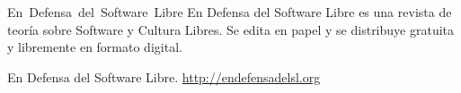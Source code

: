     \newpage
    \thispagestyle{empty}

    \begin{flushleft}\hbox{\Large{En Defensa del Software Libre}}
    En Defensa del Software Libre es una revista de teoría sobre Software y Cultura
    Libres. Se edita en papel y se distribuye gratuita y libremente en formato
    digital. 

    \vfill
    \copyleft  \the\year  En Defensa del Software Libre.
    \url{http://endefensadelsl.org}

    \end{flushleft}
   \newpage

